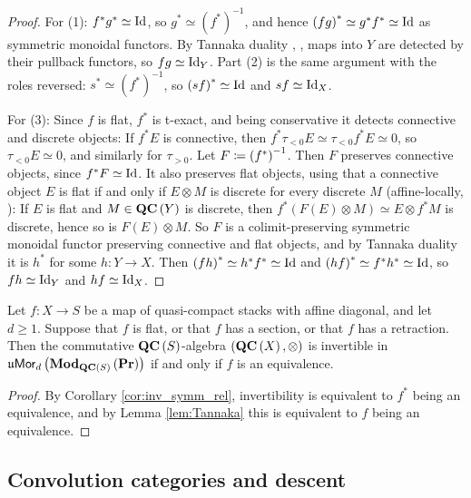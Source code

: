 \begin{proof}
For (1): $f^*g^*\simeq\operatorname{Id}$, so $g^*\simeq\left(f^*\right)^{-1}$, and hence
$\left(fg\right)^*\simeq g^*f^*\simeq\operatorname{Id}$ as symmetric monoidal functors.
By Tannaka duality \cite[Theorem 9.2.0.2]{L:SAG}, \cite{BHL}, maps into $Y$
are detected by their pullback functors, so $fg\simeq\operatorname{Id}_Y$.
Part (2) is the same argument with the roles reversed: $s^*\simeq\left(f^*\right)^{-1}$,
so $\left(sf\right)^*\simeq\operatorname{Id}$ and $sf\simeq\operatorname{Id}_X$.

For (3): Since $f$ is flat, $f^*$ is t-exact, and being conservative it detects connective
and discrete objects: If $f^*E$ is connective, then
$f^*\tau_{<0}E\simeq\tau_{<0}f^*E\simeq 0$, so $\tau_{<0}E\simeq 0$, and similarly for
$\tau_{>0}$.
Let $F\coloneqq\left(f^*\right)^{-1}$. Then $F$ preserves connective objects, since
$f^*F\simeq\operatorname{Id}$. It also preserves flat objects, using that a connective object $E$ is flat if and only if
$E\otimes M$ is discrete for every discrete $M$ (affine-locally, \cite[Section 7.2.2]{L:HA}): If $E$ is flat
and $M\in\mathbf{QC}\left(Y\right)$ is discrete, then $f^*\left(F\left(E\right)\otimes M\right)\simeq
E\otimes f^*M$ is discrete, hence so is $F\left(E\right)\otimes M$.
So $F$ is a colimit-preserving symmetric monoidal functor preserving connective and flat
objects, and by Tannaka duality it is $h^*$ for some $h\colon Y\to X$.
Then $\left(fh\right)^*\simeq h^*f^*\simeq\operatorname{Id}$ and $\left(hf\right)^*\simeq f^*h^*\simeq\operatorname{Id}$,
so $fh\simeq\operatorname{Id}_Y$ and $hf\simeq\operatorname{Id}_X$.
\end{proof}

\begin{theorem}
\label{thm:inv_rel}
Let $f\colon X\to S$ be a map of quasi-compact stacks with affine diagonal, and let
$d\geq 1$.
Suppose that $f$ is flat, or that $f$ has a section, or that $f$ has a retraction.
Then the commutative $\mathbf{QC}\left(S\right)$-algebra $\left(\mathbf{QC}\left(X\right),\otimes\right)$
is invertible in $\mathfrak{u}\mathsf{Mor}_d\left(\mathbf{Mod}_{\mathbf{QC}\left(S\right)}\left(\mathbf{Pr}\right)\right)$ if and only if
$f$ is an equivalence.
\end{theorem}

\begin{proof}
By Corollary \ref{cor:inv_symm_rel}, invertibility is equivalent to $f^*$ being an
equivalence, and by Lemma \ref{lem:Tannaka} this is equivalent to $f$ being an equivalence.
\end{proof}

\subsection{Convolution categories and descent}
\label{sec:convolution}
\label{sec:conv}

